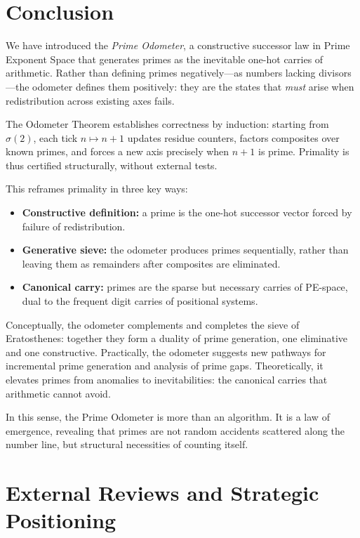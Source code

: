 \documentclass[12pt]{article}
\theoremstyle{definition}
\theoremstyle{remark}
\begin{document}

\section{Conclusion}

We have introduced the \emph{Prime Odometer}, a constructive successor law in Prime Exponent
Space that generates primes as the inevitable one-hot carries of arithmetic. Rather than defining
primes negatively---as numbers lacking divisors---the odometer defines them positively: they are
the states that \emph{must} arise when redistribution across existing axes fails.

The Odometer Theorem establishes correctness by induction: starting from $\sigma(2)$, each tick
$n \mapsto n+1$ updates residue counters, factors composites over known primes, and forces a new
axis precisely when $n+1$ is prime. Primality is thus certified structurally, without external
tests.

This reframes primality in three key ways:

\begin{itemize}
  \item \textbf{Constructive definition:} a prime is the one-hot successor vector forced by failure
        of redistribution.
  \item \textbf{Generative sieve:} the odometer produces primes sequentially, rather than leaving
        them as remainders after composites are eliminated.
  \item \textbf{Canonical carry:} primes are the sparse but necessary carries of PE-space, dual to
        the frequent digit carries of positional systems.
\end{itemize}

Conceptually, the odometer complements and completes the sieve of Eratosthenes: together they form
a duality of prime generation, one eliminative and one constructive. Practically, the odometer
suggests new pathways for incremental prime generation and analysis of prime gaps. Theoretically,
it elevates primes from anomalies to inevitabilities: the canonical carries that arithmetic cannot
avoid.

In this sense, the Prime Odometer is more than an algorithm. It is a law of emergence, revealing
that primes are not random accidents scattered along the number line, but structural necessities of
counting itself.


\section*{External Reviews and Strategic Positioning}
\end{document}
